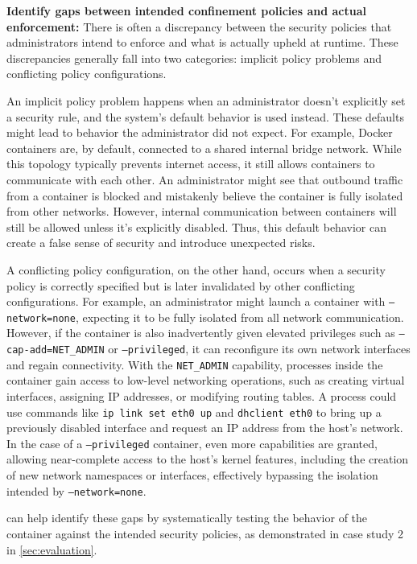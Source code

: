\noindent\textbf{Identify gaps between intended confinement policies and actual enforcement:}
There is often a discrepancy between the security policies that administrators intend to enforce and what is actually upheld at runtime. These discrepancies generally fall into two categories: implicit policy problems and conflicting policy configurations.

An implicit policy problem happens when an administrator doesn't explicitly set a security rule, and the system's default behavior is used instead. These defaults might lead to behavior the administrator did not expect. For example, Docker containers are, by default, connected to a shared internal bridge network. While this topology typically prevents internet access, it still allows containers to communicate with each other. An administrator might see that outbound traffic from a container is blocked and mistakenly believe the container is fully isolated from other networks. However, internal communication between containers will still be allowed unless it's explicitly disabled. Thus, this default behavior can create a false sense of security and introduce unexpected risks.

A conflicting policy configuration, on the other hand, occurs when a security policy is correctly specified but is later invalidated by other conflicting configurations. For example, an administrator might launch a container with \texttt{--network=none}, expecting it to be fully isolated from all network communication. However, if the container is also inadvertently given elevated privileges such as \texttt{--cap-add=NET\_ADMIN} or \texttt{--privileged}, it can reconfigure its own network interfaces and regain connectivity. With the \texttt{NET\_ADMIN} capability, processes inside the container gain access to low-level networking operations, such as creating virtual interfaces, assigning IP addresses, or modifying routing tables. A process could use commands like \texttt{ip link set eth0 up} and \texttt{dhclient eth0} to bring up a previously disabled interface and request an IP address from the host’s network. In the case of a \texttt{--privileged} container, even more capabilities are granted, allowing near-complete access to the host's kernel features, including the creation of new network namespaces or interfaces, effectively bypassing the isolation intended by \texttt{--network=none}.

\houdini can help identify these gaps by systematically testing the behavior of the container against the intended security policies, as demonstrated in case study 2 in \cref{sec:evaluation}.

